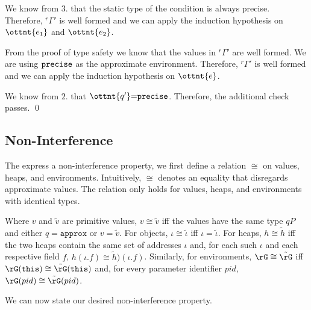 
We know from $3.$ that the static type of the condition is always
precise.
Therefore, $\mathit{ {^r}\!\Gamma}'$ is well formed and we can apply the induction
hypothesis on $\ottnt{e_{{\mathrm{1}}}}$ and $\ottnt{e_{{\mathrm{2}}}}$.



From the proof of type safety we know that the values in $\mathit{ {^r}\!\Gamma}'$ are
well formed. We are using $ \texttt{\upshape{precise}\,\!} $ as the approximate environment.
Therefore, $\mathit{ {^r}\!\Gamma}'$ is well formed and we can apply the induction
hypothesis on $\ottnt{e}$.



We know from $2.$ that $\ottnt{q'}  \textsf{=}   \texttt{\upshape{precise}\,\!} $.
Therefore, the additional check passes.
\qed


\subsection{Non-Interference}

The express a non-interference property, we first define a relation $\cong$ on
values, heaps, and environments. Intuitively, 
$\cong$ denotes an equality that disregards approximate
values. The relation only holds for values, heaps, and environments with
identical types.

Where $v$ and $\tilde{v}$ are primitive values, $v \cong \tilde{v}$ iff the
values have the same type $qP$ and either $q = \mathtt{approx}$ or $v =
\tilde{v}$. For objects, $\iota \cong \tilde{\iota}$ iff $\iota =
\tilde{\iota}$.
For heaps, $h \cong \tilde{h}$ iff the two heaps contain the same set of
addresses $\iota$ and, for each such $\iota$ and each respective field
$f$, $h(\iota.f) \cong \tilde{h})(\iota.f)$. Similarly, for environments,
$\rG \cong \tilde{\rG}$ iff
$\rG(\texttt{this}) \cong \tilde{\rG}(\texttt{this})$ and, for every parameter
identifier $pid$, $\rG(pid) \cong \tilde{\rG}(pid)$.

We can now state our desired non-interference property.

